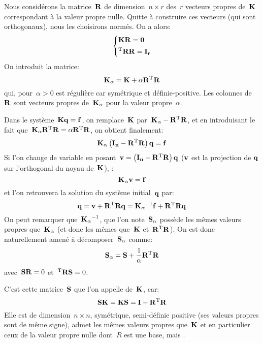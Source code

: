 \medskip
Nous considérons la matrice~$\MM{R}$ de dimension~$n\times r$ des~$r$ vecteurs propres de~$\MM{K}$
correspondant à la valeur propre nulle. Quitte à construire ces vecteurs (qui sont orthogonaux),
nous les choisirons normés. On a alors:
\begin{equation}
\left\{
\begin{aligned}
&\MM{K}\MM{R}=\MM{0}\\
&\MMT{R}\MM{R}=\MM{I_r}
\end{aligned}
\right.
\end{equation}
On introduit la matrice:
\begin{equation} \MM{K_\alpha} = \MM{K}+\alpha \MM{R}\MMT{R} \end{equation}
qui, pour~$\alpha>0$ est régulière car symétrique et définie-positive.
Les colonnes de~$\MM{R}$ sont vecteurs propres de~$\MM{K_\alpha}$ pour la valeur propre~$\alpha$.

Dans le système~$\MM{K}\VV{q}=\VV{f}$, on remplace~$\MM{K}$ par~$\MM{K_\alpha}-\MM{R}\MMT{R}$, et en introduisant le
fait que~$\MM{K_\alpha}\MM{R}\MMT{R}=\alpha \MM{R}\MMT{R}$, on obtient finalement:
\begin{equation}
\MM{K_\alpha} \left(\MM{I_n}-\MM{R}\MMT{R}\right)\VV{q}=\VV{f}
\end{equation}
Si l'on change de variable en posant~$\VV{v}=\left(\MM{I_n}-\MM{R}\MMT{R}\right)\VV{q}$ ($\VV{v}$ est la projection de
$\VV{q}$ sur l'orthogonal du noyau de~$\MM{K}$), :
\begin{equation}
\MM{K_\alpha}\VV{v}=\VV{f}
\end{equation}
et l'on retrouvera la solution du système initial~$\VV{q}$ par:
\begin{equation}\VV{q}=\VV{v}+\MM{R}\MMT{R}\VV{q} = \MMI{K_\alpha}\VV{f}+\MM{R}\MMT{R}\VV{q}\end{equation}
\medskip
On peut remarquer que~$\MMI{K_\alpha}$, que l'on note~$\MM{S_\alpha}$ possède les mêmes
valeurs propres que~$\MM{K_\alpha}$ (et donc les mêmes que~$\MM{K}$ et~$\MM{R}\MMT{R}$). On est donc
naturellement amené à décomposer~$\MM{S_\alpha}$ comme:
\begin{equation} \MM{S_\alpha}=\MM{S}+\frac1\alpha \MM{R}\MMT{R}\end{equation}
avec~$\MM{S}\MM{R}=0$ et~$\MMT{R}\MM{S}=0$.

C'est cette matrice~$\MM{S}$ que l'on appelle  de~$\MM{K}$, car:
\begin{equation} \MM{S}\MM{K} = \MM{K}\MM{S} = \MM{I} -\MM{R}\MMT{R}\end{equation}
Elle est de dimension~$n\times n$, symétrique, semi-définie positive (ses valeurs propres
sont de même signe), admet les mêmes valeurs propres que~$\MM{K}$ et en particulier ceux
de la valeur propre nulle dont~$R$ est une base, mais .

